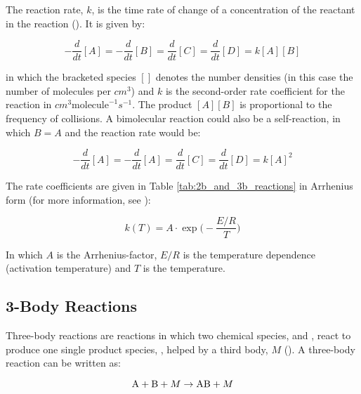 


The reaction rate, $k$, is the time rate of change of a concentration of the reactant in the reaction (\cite{AtmModFund}). It is given by: 

\begin{equation*}
    -\frac{d}{dt}[A] = -\frac{d}{dt}[B] = \frac{d}{dt}[C] = \frac{d}{dt}[D] = k[A][B]
\end{equation*}

in which the bracketed species $[]$ denotes the number densities (in this case the number of molecules per $cm^3$) and $k$ is the second-order rate coefficient for the reaction in $cm^3\text{molecule}^{-1}s^{-1}$. The product $[A][B]$ is proportional to the frequency of collisions. A bimolecular reaction could also be a self-reaction, in which $B = A$ and the reaction rate would be:

\begin{equation*}
    -\frac{d}{dt}[A] = -\frac{d}{dt}[A] = \frac{d}{dt}[C] = \frac{d}{dt}[D] = k[A]^2
\end{equation*}

The rate coefficients are given in Table \ref{tab:2b_and_3b_reactions} in Arrhenius form (for more information, see \cite{JPL}):

\begin{equation}
    k(T) = A\cdot\exp{\Big(-\frac{E/R}{T}\Big)}
    \label{eq:2b_rate_coeff}
\end{equation}

In which $A$ is the Arrhenius-factor, $E/R$ is the temperature dependence (activation temperature) and $T$ is the temperature. 

\subsection{3-Body Reactions}\label{sec:3body_reactions}

Three-body reactions are reactions in which two chemical species,  and , react to produce one single product species, , helped by a third body, $M$ (\cite{Jacob1999}). A three-body reaction can be written as: 

\begin{equation*}
    \mathrm{A} + \mathrm{B} + M \rightarrow \mathrm{AB} + M
\end{equation*}


